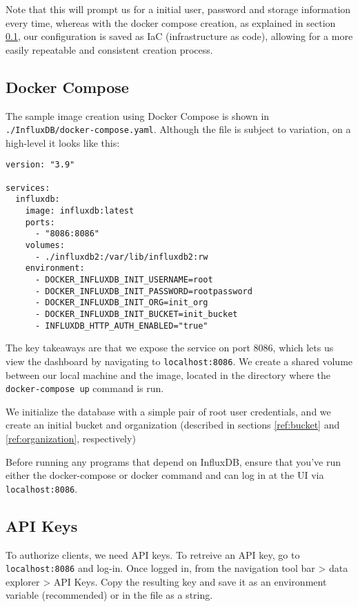 \documentclass{article}
\begin{document}
Note that this will prompt us for a initial user, password and storage information every time, whereas with the docker compose creation, as explained in section \ref{docker-compose}, our configuration is saved as IaC (infrastructure as code), allowing for a more easily repeatable and consistent creation process.

\subsection{Docker Compose}\label{docker-compose}

The sample image creation using Docker Compose is shown in \verb|./InfluxDB/docker-compose.yaml|. Although the file is subject to variation, on a high-level it looks like this:

\begin{verbatim}
version: "3.9"

services:
  influxdb:
    image: influxdb:latest
    ports:
      - "8086:8086"
    volumes:
      - ./influxdb2:/var/lib/influxdb2:rw
    environment:
      - DOCKER_INFLUXDB_INIT_USERNAME=root
      - DOCKER_INFLUXDB_INIT_PASSWORD=rootpassword
      - DOCKER_INFLUXDB_INIT_ORG=init_org
      - DOCKER_INFLUXDB_INIT_BUCKET=init_bucket
      - INFLUXDB_HTTP_AUTH_ENABLED="true"
\end{verbatim}

The key takeaways are that we expose the service on port 8086, which lets us view the dashboard by navigating to \verb|localhost:8086|. We create a shared volume between our local machine and the image, located in the directory where the \verb|docker-compose up| command is run. 

We initialize the database with a simple pair of root user credentials, and we create an initial bucket and organization (described in sections \ref{ref:bucket} and \ref{ref:organization}, respectively)

Before running any programs that depend on InfluxDB, ensure that you've run either the docker-compose or docker command and can log in at the UI via \verb|localhost:8086|.

\subsection{API Keys}

To authorize clients, we need API keys. To retreive an API key, go to \verb|localhost:8086| and log-in. Once logged in, from the navigation tool bar > data explorer > API Keys. Copy the resulting key and save it as an environment variable (recommended) or in the file as a string.
\end{document}
